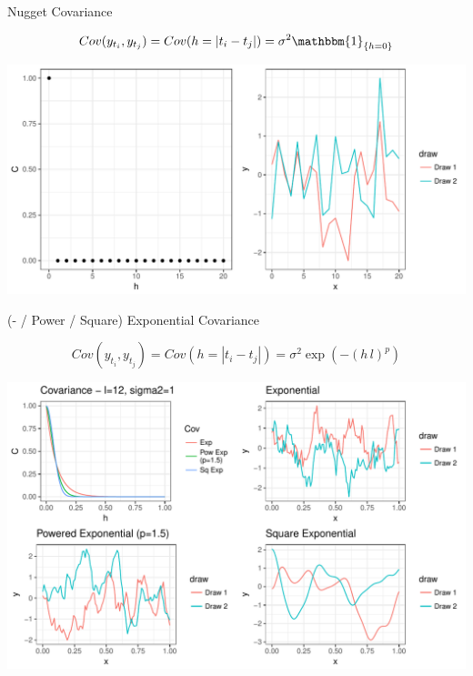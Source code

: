 \documentclass[11pt,ignorenonframetext,]{beamer}
\begin{document}
\begin{frame}[t]{Nugget Covariance}

\[ Cov(y_{t_i}, y_{t_j}) = Cov(h = |t_i - t_j|) = \sigma^2 \mathbbm{1}_{\{h=0\}} \]

\includegraphics{Lec14_files/figure-beamer/unnamed-chunk-9-1.pdf}

\end{frame}

\begin{frame}[t]{(- / Power / Square) Exponential Covariance}

\vspace{-5mm}
\[ Cov(y_{t_i}, y_{t_j}) = Cov(h = |t_i - t_j|) = \sigma^2\exp\left(-(h\,l)^p\right) \]

\begin{center}\includegraphics{Lec14_files/figure-beamer/unnamed-chunk-10-1} \end{center}

\end{frame}
\end{document}
